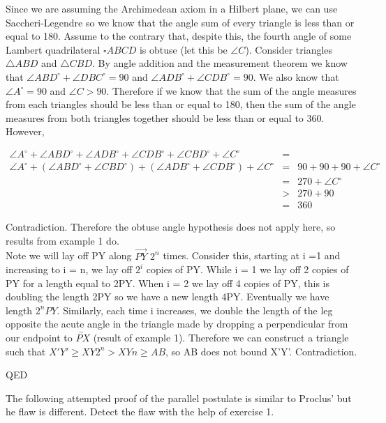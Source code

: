 \documentclass[12pt,letterpaper]{article}
\newcommand{\QED}{\begin{flushright}QED\end{flushright}}
\newcommand{\prob}[1]{\newpage\noindent {\bf #1}}
\begin{document}
Since we are assuming the Archimedean axiom in a Hilbert plane, we can use Saccheri-Legendre so we know that the angle sum of every triangle is less than or equal to 180.  Assume to the contrary that, despite this, the fourth angle of some Lambert quadrilateral $\square ABCD$ is obtuse (let this be $\angle C$). Consider triangles $\triangle ABD$ and $\triangle CBD$.  By angle addition and the measurement theorem we know that $\angle ABD^\circ + \angle DBC^\circ = 90$ and $\angle ADB^\circ + \angle CDB^\circ = 90$.  We also know that $\angle A^\circ = 90$ and $\angle C > 90$.  Therefore if we know that the sum of the angle measures from each triangles should be less than or equal to 180, then the sum of the angle measures from both triangles together should be less than or equal to 360.  However, 

\begin{eqnarray*}
\angle A^\circ + \angle ABD^\circ + \angle ADB^\circ+ \angle CDB^\circ+ \angle CBD^\circ+ \angle C^\circ &=&\\ \angle A^\circ + (\angle ABD^\circ+ \angle CBD^\circ) + (\angle ADB^\circ+ \angle CDB^\circ)+ \angle C^\circ &=& 90 + 90 + 90+ \angle C^\circ\\
&=& 270 + \angle C^\circ\\
&>& 270 + 90\\
&=& 360
\end{eqnarray*}

Contradiction.  Therefore the obtuse angle hypothesis does not apply here, so results from example 1 do.\\

Note we will lay off PY along $\overrightarrow{PY}$ $2^{n}$ times.  Consider this, starting at i =1 and increasing to i = n, we lay off $2^i$ copies of PY.  While i = 1 we lay off 2 copies of PY for a length equal to 2PY.  When i = 2 we lay off 4 copies of PY, this is doubling the length 2PY so we have a new length 4PY.  Eventually we have length $2^n PY$.  Similarly, each time i increases, we double the length of the leg opposite the acute angle in the triangle made by dropping a perpendicular from our endpoint to $\overleftrightarrow{PX}$ (result of example 1).  Therefore we can construct a triangle such that $X'Y' \geq XY 2^{n} > XY n \geq AB$, so AB does not bound X'Y'.  Contradiction.




\QED





\prob{6} The following attempted proof of the parallel postulate is similar to Proclus' but he flaw is different.  Detect the flaw with the help of exercise 1.\\
\end{document}
